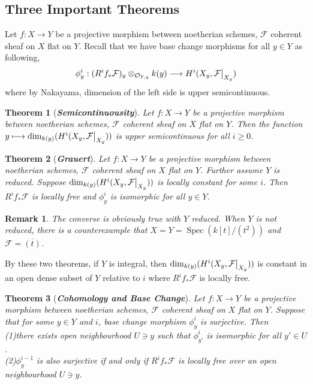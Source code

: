 \documentclass{ctexart}
\newtheorem{remark}{Remark}[section]
\newtheorem{theorem}{Theorem}[section]
\newcommand{\spec}{\operatorname{Spec}}
\begin{document}
\subsection{Three Important Theorems}
Let $f: X \longrightarrow Y$ be a projective morphism between noetherian schemes, $\mathcal{F}$ coherent sheaf on $X$ flat on $Y$.
Recall that we have base change morphisms for all $y\in Y$ as following,
\begin{equation*}
    \phi_{y}^{i}: (R^{i}f_{\ast}\mathcal{F})_{y} \otimes_{\mathcal{O}_{Y, y}} k(y) \longrightarrow H^{i}(X_{y}, \mathcal{F}\big{|}_{X_{y}})
\end{equation*}
where by Nakayama, dimension of the left side is upper semicontinuous.
\begin{theorem}[\textbf{\emph{Semicontinuousity}}]
    Let $f: X \longrightarrow Y$ be a projective morphism between noetherian schemes, $\mathcal{F}$ coherent sheaf on $X$ flat on $Y$.
    Then the function $y \longmapsto \dim_{k(y)}(H^{i}(X_{y}, \mathcal{F}\big{|}_{X_{y}}))$ is upper semicontinuous for all $i \ge 0$.
    \label{Theorem 12.2}
\end{theorem}
\begin{theorem}[\textbf{\emph{Grauert}}]
    Let $f: X \longrightarrow Y$ be a projective morphism between noetherian schemes, $\mathcal{F}$ coherent sheaf on $X$ flat on $Y$.
    Further assume $Y$ is reduced.
    Suppose $\dim_{k(y)}(H^{i}(X_{y}, \mathcal{F}\big{|}_{X_{y}}))$ is locally constant for some $i$. 
    Then $R^{i}f_{\ast}\mathcal{F}$ is locally free and $\phi_{y}^{i}$ is isomorphic for all $y\in Y$.
    \label{Theorem 12.3}
\end{theorem}
\begin{remark}
    The converse is obviously true with $Y$ reduced.
    When $Y$ is not reduced, there is a counterexample that $X = Y = \spec(k[t]/(t^{2}))$ and $\mathcal{F} = \overline{(t)}$.
\end{remark}
By these two theorems, if $Y$ is integral, then $\dim_{k(y)}(H^{i}(X_{y}, \mathcal{F}\big{|}_{X_{y}}))$ is constant in an open dense subset of $Y$ relative to $i$ where $R^{i}f_{\ast}\mathcal{F}$ is locally free.
\begin{theorem}[\textbf{\emph{Cohomology and Base Change}}]
    Let $f: X \longrightarrow Y$ be a projective morphism between noetherian schemes, $\mathcal{F}$ coherent sheaf on $X$ flat on $Y$.
    Suppose that for some $y\in Y$ and $i$, base change morphism $\phi_{y}^{i}$ is surjective.
    Then \\
    (1)there exists open neighbourhood $U\ni y$ such that $\phi_{y'}^{i}$ is isomorphic for all $y'\in U$. \\
    (2)$\phi_{y}^{i - 1}$ is also surjective if and only if $R^{i}f_{\ast}\mathcal{F}$ is locally free over an open neighbourhood $U\ni y$.
    \label{Theorem 12.4}
\end{theorem}
\end{document}
